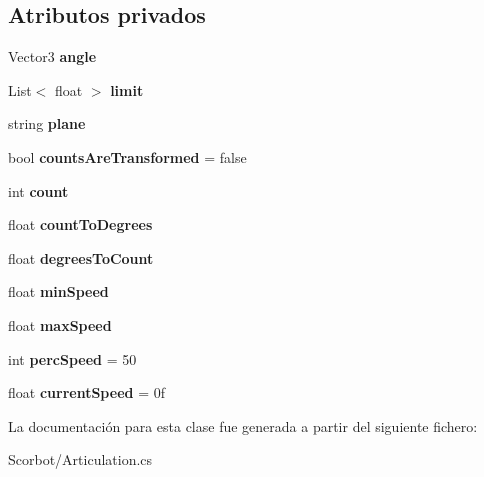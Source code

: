 \subsection*{Atributos privados}
\begin{DoxyCompactItemize}
\item 
\mbox{\label{class_articulation_abd23ea47f7f82fc1137a2a67511ca9bb}} 
Vector3 {\bfseries angle}
\item 
\mbox{\label{class_articulation_abbe4425e0bfa1964ced48a025a50d326}} 
List$<$ float $>$ {\bfseries limit}
\item 
\mbox{\label{class_articulation_a87fba785eed8db50cb379536ce7ef168}} 
string {\bfseries plane}
\item 
\mbox{\label{class_articulation_a1dc922cba9a344d7769cf60a33733c79}} 
bool {\bfseries counts\+Are\+Transformed} = false
\item 
\mbox{\label{class_articulation_a0dca73c052d5fbfbf5a86a351f2b38ed}} 
int {\bfseries count}
\item 
\mbox{\label{class_articulation_a6364c5edba29a5b74a587be7f0b6e320}} 
float {\bfseries count\+To\+Degrees}
\item 
\mbox{\label{class_articulation_ad2cbeae71ddd9f987dae8f6ece7d0b78}} 
float {\bfseries degrees\+To\+Count}
\item 
\mbox{\label{class_articulation_a9f180a4dd504e1e824b0260195540569}} 
float {\bfseries min\+Speed}
\item 
\mbox{\label{class_articulation_a64600f7d0fb637860d01de29536ebe20}} 
float {\bfseries max\+Speed}
\item 
\mbox{\label{class_articulation_abb6ffedc22b45cd27a59c23124227b0e}} 
int {\bfseries perc\+Speed} = 50
\item 
\mbox{\label{class_articulation_a1522e4342b1ac429b245e84d805d34d8}} 
float {\bfseries current\+Speed} = 0f
\end{DoxyCompactItemize}


La documentación para esta clase fue generada a partir del siguiente fichero\+:\begin{DoxyCompactItemize}
\item 
Scorbot/Articulation.\+cs\end{DoxyCompactItemize}
